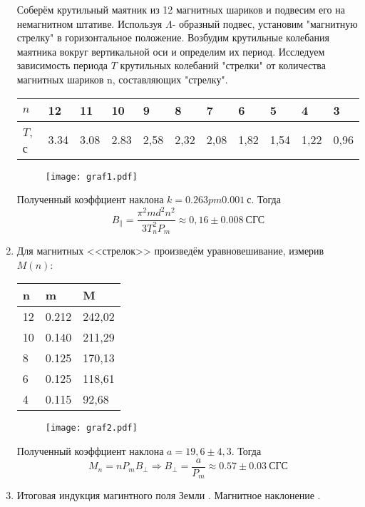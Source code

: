 \documentclass[a4paper,12pt]{article}
\begin{document}
\begin{enumerate}
Соберём крутильный маятник из 12 магнитных шариков и подвесим его на немагнитном штативе. Используя $\Lambda$- образный подвес, установим "магнитную стрелку" в горизонтальное положение.
Возбудим крутильные колебания маятника вокруг вертикальной оси и определим их период. Исследуем зависимость периода $T$ крутильных колебаний "стрелки" от количества магнитных шариков n, составляющих "стрелку". 

\begin{table}[h]
\centering
\begin{tabular}{|l|l|l|l|l|l|l|l|l|l|l|}
\hline
$n$ & 12    & 11    & 10    & 9     & 8     & 7     & 6     & 5     & 4    & 3     \\ \hline
$T$, с & 3.34 & 3.08 &  2.83   & 2,58 & 2,32 & 2,08  & 1,82 & 1,54 & 1,22  & 0,96 \\ \hline
\end{tabular}
\end{table}
\begin{figure}[ht!]
	\centering
	\texttt{[image: graf1.pdf]}
	\label{C}
\end{figure}

Полученный коэффциент наклона $k= 0.263pm 0.001~\text{с}$. Тогда 
$$B_{\|} = \frac{\pi^2 md^2n^2}{3 T_n^2 P_m}\approx 0,16 \pm 0.008 ~\text{СГС} $$


\item Для магнитных <<стрелок>> произведём уравновешивание, измерив $M(n)$:
\begin{table}[h]
	\centering
\begin{tabular}{|l|l|l|}
\hline
n  &  m   & M \\ \hline
12 & 0.212 & 242,02      \\ \hline
10 & 0.140  & 211,29      \\ \hline
8  & 0.125  & 170,13     \\ \hline
6  & 0.125  & 118,61       \\ \hline
4  & 0.115 & 92,68       \\ \hline
\end{tabular}
\end{table}

\begin{center}
	\begin{figure}[ht!]
		\centering
		\texttt{[image: graf2.pdf]}
		\label{C}
	\end{figure}
	 
\end{center}
Полученный коэффциент наклона $a = 19,6 \pm 4,3$. Тогда
$$M_n = nP_mB_{\perp} \Rightarrow B_{\perp} = \frac{a}{P_m} \approx 0.57 \pm 0.03 ~\text{СГС} $$
 
\item Итоговая индукция магинтного поля Земли .
Магнитное наклонение . 
\end{enumerate}
\end{document}
